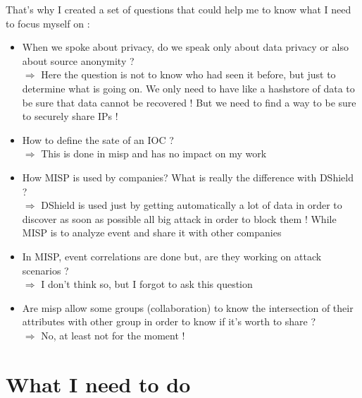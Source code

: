 \documentclass[10pt]{article}
\begin{document}
That's why I created a set of questions that could help me to know what I need to focus myself on :
\begin{itemize}
\item When we spoke about privacy, do we speak only about data privacy or also about source anonymity ? \\
$\Rightarrow$ Here the question is not to know who had seen it before, but just to determine what is going on. We only need to have like a hashstore of data to be sure that data cannot be recovered ! But we need to find a way to be sure to securely share IPs !
\item How to define the sate of an IOC ?\\
 $\Rightarrow$ This is done in misp and has no impact on my work
\item How MISP is used by companies? What is really the difference with DShield ?\\
$\Rightarrow$ DShield is used just by getting automatically a lot of data in order to discover as soon as possible all big attack in order to block them ! While MISP is to analyze event and share it with other companies
\item In MISP, event correlations are done but, are they working on attack scenarios ?\\
$\Rightarrow$ I don't think so, but I forgot to ask this question
\item Are misp allow some groups (collaboration) to know the intersection of their attributes with other group in order to know if it's worth to share ?\\
 $\Rightarrow$ No, at least not for the moment !
\end{itemize}

\section{What I need to do}
\end{document}
